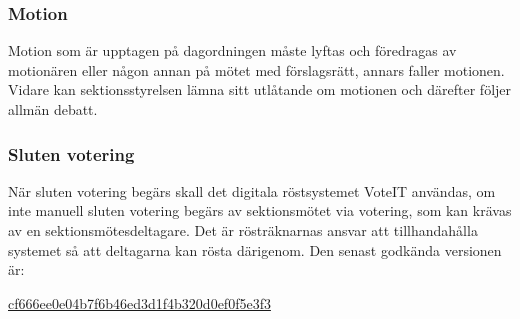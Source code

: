 \subsubsection{Motion}
Motion som är upptagen på dagordningen måste lyftas och föredragas av motionären eller någon annan på mötet med förslagsrätt, annars faller motionen. Vidare kan sektionsstyrelsen lämna sitt utlåtande om motionen och därefter följer allmän debatt.

\subsubsection{Sluten votering}
När sluten votering begärs skall det digitala röstsystemet VoteIT användas, om inte manuell sluten votering begärs av sektionsmötet via votering, som kan krävas av en sektionsmötesdeltagare. Det är rösträknarnas ansvar att tillhandahålla systemet så att deltagarna kan rösta därigenom. Den senast godkända versionen är:

\href{https://github.com/cthit/VoteIT/commit/cf666ee0e04b7f6b46ed3d1f4b320d0ef0f5e3f3}{cf666ee0e04b7f6b46ed3d1f4b320d0ef0f5e3f3}